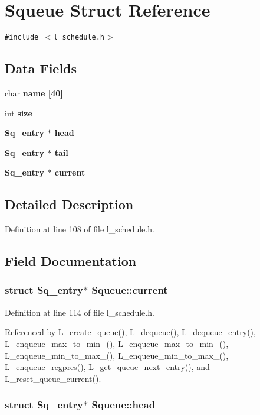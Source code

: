 \section{Squeue Struct Reference}
\label{structSqueue}
{\tt \#include $<$l\_\-schedule.h$>$}

\subsection*{Data Fields}
\begin{CompactItemize}
\item 
char \bf{name} [40]
\item 
int \bf{size}
\item 
\bf{Sq\_\-entry} $\ast$ \bf{head}
\item 
\bf{Sq\_\-entry} $\ast$ \bf{tail}
\item 
\bf{Sq\_\-entry} $\ast$ \bf{current}
\end{CompactItemize}


\subsection{Detailed Description}




Definition at line 108 of file l\_\-schedule.h.

\subsection{Field Documentation}
\subsubsection{\setlength{\rightskip}{0pt plus 5cm}struct \bf{Sq\_\-entry}$\ast$ \bf{Squeue::current}}\label{structSqueue_1739147b7428df9891da9bb6bbb29584}




Definition at line 114 of file l\_\-schedule.h.

Referenced by L\_\-create\_\-queue(), L\_\-dequeue(), L\_\-dequeue\_\-entry(), L\_\-enqueue\_\-max\_\-to\_\-min\_(), L\_\-enqueue\_\-max\_\-to\_\-min\_(), L\_\-enqueue\_\-min\_\-to\_\-max\_(), L\_\-enqueue\_\-min\_\-to\_\-max\_(), L\_\-enqueue\_\-regpres(), L\_\-get\_\-queue\_\-next\_\-entry(), and L\_\-reset\_\-queue\_\-current().
\subsubsection{\setlength{\rightskip}{0pt plus 5cm}struct \bf{Sq\_\-entry}$\ast$ \bf{Squeue::head}}\label{structSqueue_4f8a89bc1de87d6976d1a6a314671450}




